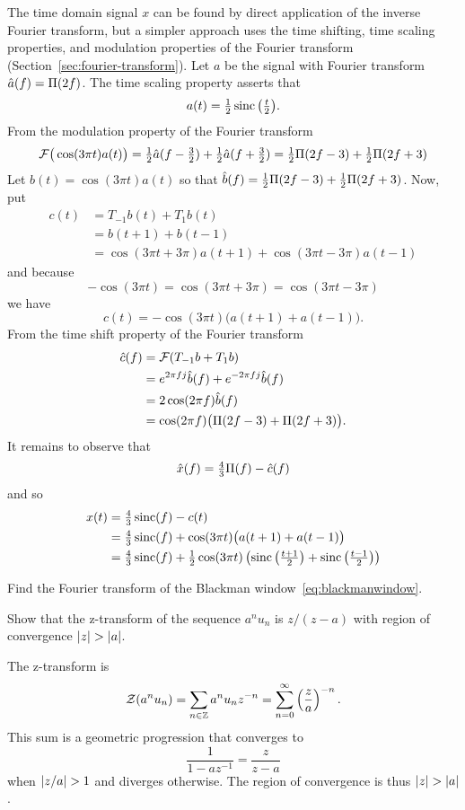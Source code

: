 \begin{excersizelist}
\begin{solution}
The time domain signal $x$ can be found by direct application of the inverse Fourier transform, but a simpler approach uses the time shifting, time scaling properties, and modulation properties of the Fourier transform (Section~\ref{sec:fourier-transform}).  Let $a$ be the signal with Fourier transform $\hat{a}(f) = \Pi(2f)$.  The time scaling property asserts that
\[
a(t) = \tfrac{1}{2} \operatorname{sinc}\big(\tfrac{t}{2}\big).
\]
From the modulation property of the Fourier transform
\[
{\mathcal F}\big( \cos(3\pi t)  a(t) \big) = \tfrac{1}{2} \hat{a}(f - \tfrac{3}{2}) + \tfrac{1}{2} \hat{a}(f + \tfrac{3}{2}) =  \tfrac{1}{2} \Pi(2f - 3) + \tfrac{1}{2} \Pi(2f +3)
\]
Let $b(t) = \cos(3\pi t)  a(t)$ so that $\hat{b}(f) = \tfrac{1}{2}\Pi(2f - 3) + \tfrac{1}{2} \Pi(2f +3)$.  Now, put 
\begin{align*}
c(t) &= T_{-1} b(t) + T_{1} b(t) \\
&= b(t+1) + b(t-1) \\
&= \cos(3\pi t + 3\pi)  a(t+1) + \cos(3\pi t - 3\pi)  a(t-1)
\end{align*}
and because 
\[
-\cos(3\pi t) = \cos(3\pi t + 3\pi) = \cos(3\pi t - 3\pi) 
\]
we have
\[
c(t) = -\cos(3\pi t)  \big( a(t+1) +  a(t-1) \big).
\]
From the time shift property of the Fourier transform
\begin{align*}
\hat{c}(f) &= {\mathcal F}( T_{-1} b + T_{1} b ) \\
&= e^{2\pi f j } \hat{b}(f) + e^{-2\pi f j } \hat{b}(f) \\
&= 2\cos(2\pi f) \hat{b}(f) \\
&= \cos(2\pi f) \big( \Pi(2f - 3) + \Pi(2f + 3) \big).
\end{align*}
It remains to observe that
\[
\hat{x}(f) = \tfrac{4}{3}\Pi(f) - \hat{c}(f)
\]
and so
\begin{align*}
x(t) &= \tfrac{4}{3} \operatorname{sinc}(f) - c(t) \\
&= \tfrac{4}{3} \operatorname{sinc}(f) + \cos(3\pi t)  \big( a(t+1) +  a(t-1) \big) \\
&= \tfrac{4}{3} \operatorname{sinc}(f) + \tfrac{1}{2} \cos(3\pi t) \left( \operatorname{sinc}\big(\tfrac{t+1}{2}\big) + \operatorname{sinc}\big(\tfrac{t-1}{2}\big) \right)
\end{align*}
\end{solution}

\item \label{exer:blackmawindowfouriertransform} Find the Fourier transform of the Blackman window~\eqref{eq:blackmanwindow}.

\item \label{exer:stepseqZtrans} Show that the z-transform of the sequence  $a^nu_n$ is $z/(z-a)$ with region of convergence $\left\vert z \right\vert > \left\vert a \right\vert$.
\begin{solution}
The z-transform is
\[
{\mathcal Z}(a^nu_n) = \sum_{n \in {\mathbb Z}} a^n u_n z^{-n} = \sum_{n=0}^\infty \left(\frac{z}{a}\right)^{-n}.
\]
This sum is a geometric progression that converges to 
\[
\frac{1}{1- a z^{-1}} = \frac{z}{ z-a}
\]
when $\left\vert z/a \right\vert > 1$ and diverges otherwise.  The region of convergence is thus $\left\vert z \right\vert > \left\vert a \right\vert$.
\end{solution}


\end{excersizelist}
